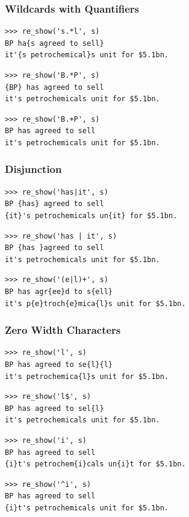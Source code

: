 \begin{frame}[fragile]
\frametitle{Wildcards with Quantifiers}


\begin{verbatim}
>>> re_show('s.*l', s)
BP ha{s agreed to sell}
it'{s petrochemical}s unit for $5.1bn.
\end{verbatim}

\begin{verbatim}
>>> re_show('B.*P', s)
{BP} has agreed to sell
it's petrochemicals unit for $5.1bn.
\end{verbatim}

\begin{verbatim}
>>> re_show('B.+P', s)
BP has agreed to sell
it's petrochemicals unit for $5.1bn.
\end{verbatim}
\end{frame}

\begin{frame}[fragile]
\frametitle{Disjunction}


\begin{verbatim}
>>> re_show('has|it', s)
BP {has} agreed to sell
{it}'s petrochemicals un{it} for $5.1bn.
\end{verbatim}

\begin{verbatim}
>>> re_show('has | it', s)
BP {has }agreed to sell
it's petrochemicals unit for $5.1bn.
\end{verbatim}

\begin{verbatim}
>>> re_show('(e|l)+', s)
BP has agr{ee}d to s{ell}
it's p{e}troch{e}mica{l}s unit for $5.1bn.
\end{verbatim}
\end{frame}


\begin{frame}[fragile]
\frametitle{Zero Width Characters}


\begin{verbatim}
>>> re_show('l', s)
BP has agreed to se{l}{l}
it's petrochemica{l}s unit for $5.1bn.
\end{verbatim}

\begin{verbatim}
>>> re_show('l$', s)
BP has agreed to sel{l}
it's petrochemicals unit for $5.1bn.
\end{verbatim}

\begin{verbatim}
>>> re_show('i', s)
BP has agreed to sell
{i}t's petrochem{i}cals un{i}t for $5.1bn.
\end{verbatim}

\begin{verbatim}
>>> re_show('^i', s)
BP has agreed to sell
{i}t's petrochemicals unit for $5.1bn.
\end{verbatim}

\end{frame}


